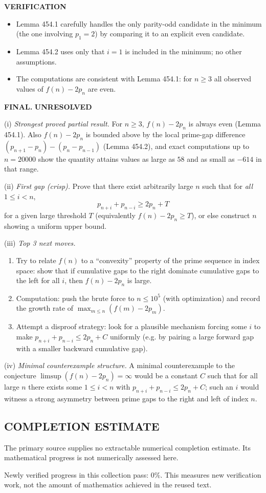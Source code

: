 \medskip

\textbf{VERIFICATION}

\begin{itemize}
\item Lemma 454.1 carefully handles the only parity-odd candidate in the minimum (the one involving $p_1=2$) by comparing it to an explicit even candidate.
\item Lemma 454.2 uses only that $i=1$ is included in the minimum; no other assumptions.
\item The computations are consistent with Lemma 454.1: for $n\ge 3$ all observed values of $f(n)-2p_n$ are even.
\end{itemize}

\textbf{FINAL.} \textbf{UNRESOLVED}

(i) \emph{Strongest proved partial result.} For $n\ge 3$, $f(n)-2p_n$ is always even (Lemma 454.1). Also $f(n)-2p_n$ is bounded above by the local prime-gap difference $(p_{n+1}-p_n)-(p_n-p_{n-1})$ (Lemma 454.2), and exact computations up to $n=20000$ show the quantity attains values as large as $58$ and as small as $-614$ in that range.

(ii) \emph{First gap (crisp).} Prove that there exist arbitrarily large $n$ such that for \emph{all} $1\le i<n$,
\[
p_{n+i}+p_{n-i}\ge 2p_n + T
\]
for a given large threshold $T$ (equivalently $f(n)-2p_n\ge T$), or else construct $n$ showing a uniform upper bound.

(iii) \emph{Top 3 next moves.}
\begin{enumerate}
\item Try to relate $f(n)$ to a ``convexity'' property of the prime sequence in index space: show that if cumulative gaps to the right dominate cumulative gaps to the left for all $i$, then $f(n)-2p_n$ is large.
\item Computation: push the brute force to $n\le 10^5$ (with optimization) and record the growth rate of $\max_{m\le n}(f(m)-2p_m)$.
\item Attempt a disproof strategy: look for a plausible mechanism forcing some $i$ to make $p_{n+i}+p_{n-i}\le 2p_n+C$ uniformly (e.g. by pairing a large forward gap with a smaller backward cumulative gap).
\end{enumerate}

(iv) \emph{Minimal counterexample structure.} A minimal counterexample to the conjecture $\limsup(f(n)-2p_n)=\infty$ would be a constant $C$ such that for all large $n$ there exists some $1\le i<n$ with $p_{n+i}+p_{n-i}\le 2p_n+C$; such an $i$ would witness a strong asymmetry between prime gaps to the right and left of index $n$.




\subsection*{COMPLETION ESTIMATE}
The primary source supplies no extractable numerical completion estimate. Its mathematical progress is not numerically assessed here.

Newly verified progress in this collection pass: $0\%$. This measures new verification work, not the amount of mathematics achieved in the reused text.
